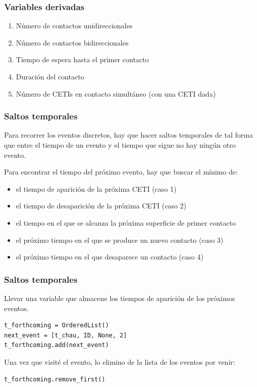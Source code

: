 \documentclass[handout]{beamer}
\theoremstyle{plain}
\theoremstyle{definition}
\theoremstyle{remark}
\begin{document}
\begin{frame}\frametitle{Variables derivadas}

   \begin{enumerate}
     \item Número de contactos unidireccionales
     \item Número de contactos bidireccionales
     \item Tiempo de espera hasta el primer contacto
     \item Duración del contacto
     \item Número de CETIs en contacto simultáneo (con una CETI dada)
   \end{enumerate}
        
\end{frame} %


 
\begin{frame}
\frametitle{Saltos temporales}

Para recorrer los eventos discretos, hay que hacer saltos temporales
de tal forma que entre el tiempo de un evento y el tiempo que sigue no
hay ningún otro evento.

Para encontrar el tiempo del próximo evento, hay que buscar el mínimo
de:

\begin{itemize}
   \item el tiempo de aparición de la próxima CETI (caso 1)
   \item el tiempo de desaparición de la próxima CETI (caso 2)
   \item el tiempo en el que se alcanza la próxima superficie de
      primer contacto
   \item el próximo tiempo en el que se produce un nuevo contacto
      (caso 3)
   \item el próximo tiempo en el que desaparece un contacto (caso 4)
\end{itemize}
\end{frame}
             

 
\begin{frame}[fragile]
\frametitle{Saltos temporales}

Llevar una variable que almacene los tiempos de aparición de los
próximos eventos.
       
\begin{lstlisting}
t_forthcoming = OrderedList()
next_event = [t_chau, ID, None, 2]
t_forthcoming.add(next_event)
\end{lstlisting}       

Una vez que visité el evento, lo elimino de la lista de los eventos
por venir:

\begin{lstlisting}
t_forthcoming.remove_first()
\end{lstlisting}       

\end{frame}
                    
\end{document}
